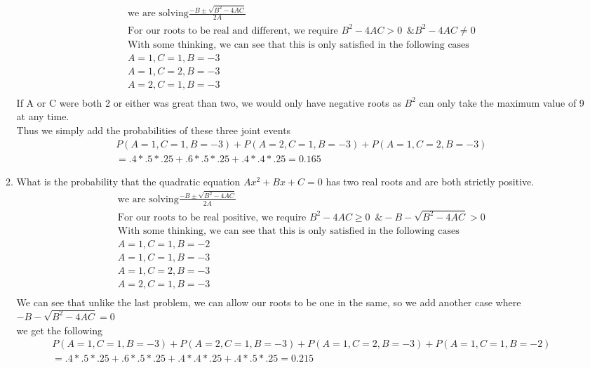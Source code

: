 \documentclass[11pt]{article}
\begin{document}
\begin{enumerate}
\begin{enumerate}
	\begin{gather}
		\text{we are solving} \frac{-B \pm \sqrt{B^2-4AC}}{2A}\\
		\text{For our roots to be real and different, we require } B^2-4AC > 0 \, \, \, \& B^2-4AC \ne 0\\
		\text{With some thinking, we can see that this is only satisfied in the following cases}\\
		A=1,C=1,B=-3\\
		A=1,C=2,B=-3\\
		A=2,C=1,B=-3\\
	\end{gather}
	If A or C were both 2 or either was great than two, we would only have negative roots as $B^2$ can only take the maximum value of 9 at any time.\\
	Thus we simply add the probabilities of these three joint events
	\begin{gather}
		P(A=1,C=1,B=-3)+P(A=2,C=1,B=-3)+P(A=1,C=2,B=-3)\\
		 = .4*.5*.25+.6*.5*.25+.4*.4*.25 = 0.165
	\end{gather}
	\item What is the probability that the quadratic equation  $Ax^2+Bx+C=0$
	has two real roots and are both strictly positive.
	\begin{gather}
	\text{we are solving} \frac{-B \pm \sqrt{B^2-4AC}}{2A}\\
	\text{For our roots to be real positive, we require } B^2-4AC \ge 0 \, \, \, \& -B - \sqrt{B^2-4AC} > 0\\
	\text{With some thinking, we can see that this is only satisfied in the following cases}\\
	A=1,C=1,B=-2\\
	A=1,C=1,B=-3\\
	A=1,C=2,B=-3\\
	A=2,C=1,B=-3\\
	\end{gather}
	We can see that unlike the last problem, we can allow our roots to be one in the same, so we add another case where $-B - \sqrt{B^2-4AC} = 0$\\
	we get the following
	\begin{gather}
	P(A=1,C=1,B=-3)+P(A=2,C=1,B=-3)+P(A=1,C=2,B=-3)+P(A=1,C=1,B=-2)\\
	= .4*.5*.25+.6*.5*.25+.4*.4*.25+.4*.5*.25 = 0.215
	\end{gather}
\end{enumerate}
\end{enumerate}
\end{document}
